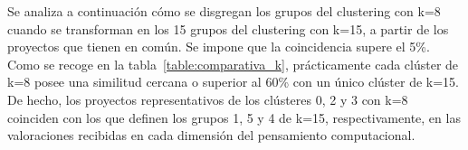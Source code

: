 \documentclass[a4paper, 12pt]{book}
\begin{document}
Se analiza a continuación cómo se disgregan los grupos del clustering con k=8 cuando se transforman en los 15 grupos del clustering con k=15, a partir de los proyectos que tienen en común. Se impone que la coincidencia supere el 5\%. Como se recoge en la tabla~\ref{table:comparativa_k}, prácticamente cada clúster de k=8 posee una similitud cercana o superior al 60\% con un único clúster de k=15. De hecho, los proyectos representativos de los clústeres 0, 2 y 3 con k=8 coinciden con los que definen los grupos 1, 5 y 4 de k=15, respectivamente, en las valoraciones recibidas en cada dimensión del pensamiento computacional. 

\begin{table}[H]
    \centering
\end{table}
\end{document}
